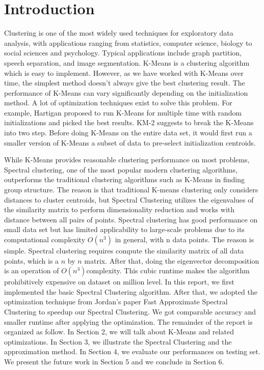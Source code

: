 \documentclass{acm_proc_article-sp}
\begin{document}
\section{Introduction}
Clustering is one of the most widely used techniques for exploratory data analysis,  with applications ranging from statistics, computer science, biology to social sciences and psychology. Typical applications include graph partition, speech separation, and image segmentation. K-Means is a  
clustering algorithm which is easy to implement. However, as we have worked with K-Means over time, the simplest method doesn't always give the best clustering result. The performance of K-Means can vary significantly depending on the initialization method. A lot of optimization techniques exist to solve this problem. For example, Hartigan proposed to run K-Means for multiple time with random initializations and picked the best results\cite{hartigan1979algorithm}. KM-2 suggests to break the K-Means into two step. Before doing K-Means on the entire data set, it would first run a smaller version of K-Means a subset of data to pre-select initialization centroids. 

While K-Means provides reasonable clustering performance on most problems, 
Spectral clustering, one of the most popular modern clustering algorithms, outperforms the traditional clustering algorithms such as K-Means in finding group structure. The reason is that traditional K-means clustering only considers distances to cluster centroids, but Spectral Clustering utilizes the eigenvalues of the similarity matrix to perform dimensionality reduction and works with distance between all pairs of points. Spectral clustering has good performance on small data set but has limited applicability to large-scale problems due to its computational complexity $O(n^3)$ in general, with n data points. The reason is simple. Spectral clustering requires compute the similarity matrix of all data points, which is a $n$ by $n$ matrix. After that, doing the eigenvector decomposition is an operation of 
$O(n^3)$complexity. This cubic runtime makes the algorithm prohibitively expensive on dataset on million level. In this report, we  first implemented the basic Spectral Clustering algorithm. After that, we adopted the optimization technique from Jordan’s paper Fast Approximate Spectral Clustering \cite{yan2009fast} to speedup our Spectral Clustering. We got comparable accuracy and smaller runtime after applying the optimization. The remainder of the report is organized as follow. In Section 2, we will talk about K-Means and related optimizations. In Section 3, we illustrate the Spectral Clustering and the approximation method. In Section 4, we evaluate our performances on testing set. We present the future work in Section 5 and we conclude in Section 6.
\end{document}
